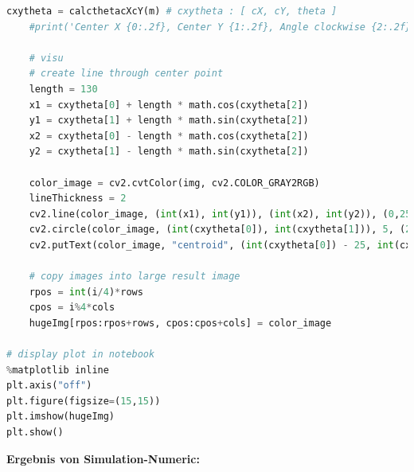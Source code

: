 \documentclass[a4paper]{report}
\begin{document}
\begin{lstlisting}[language=Python, caption=Simulation Numeric]
    cxytheta = calcthetacXcY(m) # cxytheta : [ cX, cY, theta ]
    #print('Center X {0:.2f}, Center Y {1:.2f}, Angle clockwise {2:.2f}.format(cxytheta[0],cxytheta[1],np.degrees(cxytheta[2])) )
    
    # visu
    # create line through center point
    length = 130
    x1 = cxytheta[0] + length * math.cos(cxytheta[2])
    y1 = cxytheta[1] + length * math.sin(cxytheta[2]) 
    x2 = cxytheta[0] - length * math.cos(cxytheta[2])
    y2 = cxytheta[1] - length * math.sin(cxytheta[2]) 
 
    color_image = cv2.cvtColor(img, cv2.COLOR_GRAY2RGB)
    lineThickness = 2
    cv2.line(color_image, (int(x1), int(y1)), (int(x2), int(y2)), (0,255,0), lineThickness)
    cv2.circle(color_image, (int(cxytheta[0]), int(cxytheta[1])), 5, (255, 0, 255), -1)
    cv2.putText(color_image, "centroid", (int(cxytheta[0]) - 25, int(cxytheta[1]) - 25),cv2.FONT_HERSHEY_SIMPLEX, 0.5, (255, 0, 255), 2)
    
    # copy images into large result image
    rpos = int(i/4)*rows
    cpos = i%4*cols
    hugeImg[rpos:rpos+rows, cpos:cpos+cols] = color_image

# display plot in notebook
%matplotlib inline
plt.axis("off")
plt.figure(figsize=(15,15))
plt.imshow(hugeImg)
plt.show()

\end{lstlisting}

\textbf{Ergebnis von Simulation-Numeric:}
\end{document}
